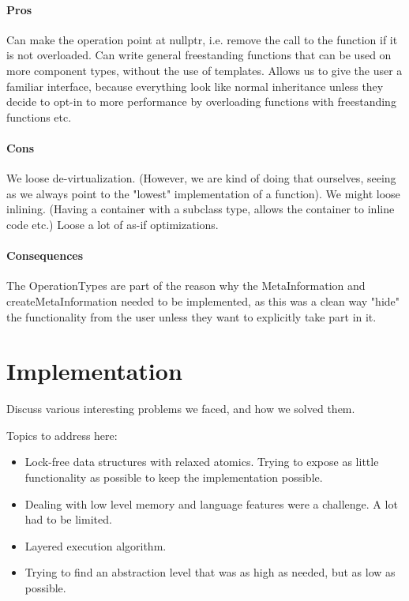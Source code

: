 \subsubsection{Pros}
Can make the operation point at nullptr, i.e. remove the call to the function if it is not overloaded.
Can write general freestanding functions that can be used on more component types, without the use of templates.
Allows us to give the user a familiar interface, because everything look like normal inheritance unless they decide to opt-in to more performance by overloading functions with freestanding functions etc.

\subsubsection{Cons}
We loose de-virtualization. (However, we are kind of doing that ourselves, seeing as we always point to the "lowest" implementation of a function).
We might loose inlining. (Having a container with a subclass type, allows the container to inline code etc.)
Loose a lot of as-if optimizations.

\subsubsection{Consequences}
The OperationTypes are part of the reason why the MetaInformation and createMetaInformation needed to be implemented,
as this was a clean way "hide" the functionality from the user unless they want to explicitly take part in it.

\chapter{Implementation}
\label{chap:implementation}
Discuss various interesting problems we faced, and how we solved them.

Topics to address here:
\begin{itemize}
    \item
    Lock-free data structures with relaxed atomics. Trying to expose as little functionality as possible to keep the implementation possible.

    \item
    Dealing with low level memory and language features were a challenge. A lot had to be limited.

    \item
    Layered execution algorithm.

    \item
    Trying to find an abstraction level that was as high as needed, but as low as possible.
\end{itemize}

